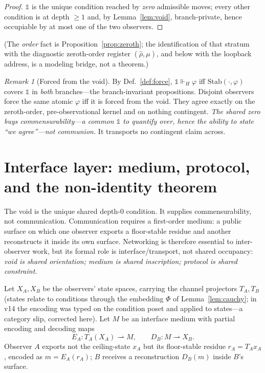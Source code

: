 \documentclass[11pt]{article}
\theoremstyle{definition}
\theoremstyle{remark}
\newtheorem*{remark}{Remark}
\newcommand{\forcesH}{\Vdash_{H}}
\newcommand{\Stab}{\mathrm{Stab}}
\begin{document}
\begin{proof}
$\mathbb{1}$ is the unique condition reached by \emph{zero} admissible moves; every other condition
is at depth $\ge1$ and, by Lemma~\ref{lem:void}, branch-private, hence occupiable by at most one of
the two observers. \end{proof}

\noindent(The \emph{order} fact is Proposition~\ref{prop:zeroth}; the identification of that stratum
with the diagnostic zeroth-order register $(\hat\rho,\mu)$, and below with the loopback address, is
a modeling bridge, not a theorem.)

\begin{remark}[Forced from the void]
By Def.~\ref{def:force}, $\mathbb{1}\forcesH\varphi$ iff $\Stab(\cdot,\varphi)$ covers $\mathbb{1}$ in
\emph{both} branches---the branch-invariant propositions. Disjoint observers force the same atomic
$\varphi$ iff it is forced from the void. They agree exactly on the zeroth-order, pre-observational
kernel and on nothing contingent. \emph{The shared zero buys commensurability---a common $\mathbb{1}$
to quantify over, hence the ability to state ``we agree''---not communion.} It transports no contingent
claim across.
\end{remark}

\section{Interface layer: medium, protocol, and the non-identity theorem}\label{sec:interface}

The void is the unique shared depth-$0$ condition. It supplies commensurability, not communication.
Communication requires a first-order medium: a public surface on which one observer exports a
floor-stable residue and another reconstructs it inside its own surface. Networking is therefore
essential to inter-observer work, but its formal role is interface/transport, not shared occupancy:
\emph{void is shared orientation; medium is shared inscription; protocol is shared constraint.}

Let $X_A,X_B$ be the observers' state spaces, carrying the channel projectors $T_A,T_B$ (states
relate to conditions through the embedding $\Phi$ of Lemma~\ref{lem:cauchy}; in v14 the encoding was
typed on the condition poset and applied to states---a category slip, corrected here). Let $M$ be an
interface medium with partial encoding and decoding maps
\[
  E_A: T_A(X_A)\rightharpoonup M,\qquad D_B: M\rightharpoonup X_B .
\]
Observer $A$ exports not the ceiling-state $x_A$ but its floor-stable residue $r_A=T_Ax_A$, encoded
as $m=E_A(r_A)$; $B$ receives a reconstruction $D_B(m)$ inside $B$'s surface.
\end{document}
